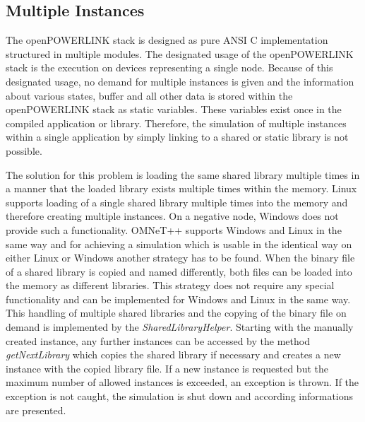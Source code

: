 \subsection{Multiple Instances}
\label{sec:porting_stack_multiinstance}
\begin{sloppypar}
The openPOWERLINK stack is designed as pure ANSI C implementation structured in multiple modules.
The designated usage of the openPOWERLINK stack is the execution on devices representing a single node.
Because of this designated usage, no demand for multiple instances is given and the information about various states, buffer and all other data is stored within the openPOWERLINK stack as static variables.
These variables exist once in the compiled application or library.
Therefore, the simulation of multiple instances within a single application by simply linking to a shared or static library is not possible.
\end{sloppypar}

The solution for this problem is loading the same shared library multiple times in a manner that the loaded library exists multiple times within the memory.
Linux supports loading of a single shared library multiple times into the memory and therefore creating multiple instances.
On a negative node, Windows does not provide such a functionality.
OMNeT++ supports Windows and Linux in the same way and for achieving a simulation which is usable in the identical way on either Linux or Windows another strategy has to be found.
When the binary file of a shared library is copied and named differently, both files can be loaded into the memory as different libraries.
This strategy does not require any special functionality and can be implemented for Windows and Linux in the same way.
This handling of multiple shared libraries and the copying of the binary file on demand is implemented by the \emph{SharedLibraryHelper}.
Starting with the manually created instance, any further instances can be accessed by the method \emph{getNextLibrary} which copies the shared library if necessary and creates a new instance with the copied library file.
If a new instance is requested but the maximum number of allowed instances is exceeded, an exception is thrown.
If the exception is not caught, the simulation is shut down and according informations are presented.


